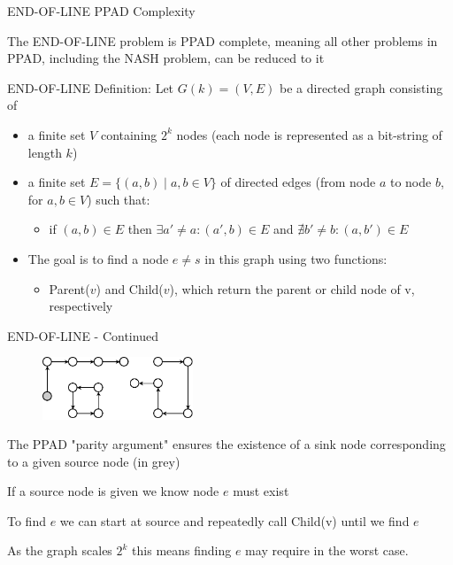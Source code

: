 \begin{frame}{END-OF-LINE PPAD Complexity}

    The END-OF-LINE problem is PPAD complete, meaning all other problems in PPAD, including the NASH problem, can be reduced to it

        END-OF-LINE Definition: Let \( G(k) = (V, E) \) be a directed graph consisting of
        \begin{itemize}
        \item a finite set \( V \) containing \( 2^k \) nodes (each node is represented as a bit-string of length \( k \))
        \item a finite set \( E = \{ (a, b) \mid a, b \in V \} \) of directed edges (from node \( a \) to node \( b \), for \( a, b \in V \)) such that:
        \begin{itemize}
        \item if \( (a, b) \in E \) then \( \exists a' \neq a: (a', b) \in E \) and \( \nexists b' \neq b: (a, b') \in E \)
        \end{itemize}
        \item The goal is to find a node \(e \neq s\) in this graph using two functions:
            \begin{itemize}
                \item Parent(\(v\)) and Child(\(v\)), which return the parent or child node of v, respectively
            \end{itemize}
        \end{itemize}
        
\end{frame}

\begin{frame}{END-OF-LINE - Continued}

\begin{figure}
    \centering
    \includegraphics[width=0.4\textwidth, height=0.4\textheight, keepaspectratio]{images/chapter_4/PPAD.pdf}
\end{figure}

\blist
    \item The PPAD "parity argument" ensures the existence of a sink node corresponding to a given source node (in grey)
    \item If a source node is given we know node \(e\) must exist
    \item To find \(e\) we can start at source and repeatedly call Child(v) until we find \(e\)
    \item As the graph scales \(2^k\) this means finding \(e\) may require  in the worst case.
\elist
    
\end{frame}

